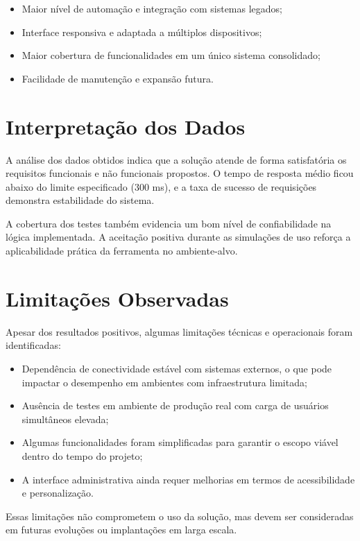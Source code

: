 \begin{itemize}
  \item Maior nível de automação e integração com sistemas legados;
  \item Interface responsiva e adaptada a múltiplos dispositivos;
  \item Maior cobertura de funcionalidades em um único sistema consolidado;
  \item Facilidade de manutenção e expansão futura.
\end{itemize}

\section{Interpretação dos Dados}

A análise dos dados obtidos indica que a solução atende de forma satisfatória os requisitos funcionais e não funcionais propostos. O tempo de resposta médio ficou abaixo do limite especificado (300 ms), e a taxa de sucesso de requisições demonstra estabilidade do sistema.

A cobertura dos testes também evidencia um bom nível de confiabilidade na lógica implementada. A aceitação positiva durante as simulações de uso reforça a aplicabilidade prática da ferramenta no ambiente-alvo.

\section{Limitações Observadas}

Apesar dos resultados positivos, algumas limitações técnicas e operacionais foram identificadas:

\begin{itemize}
  \item Dependência de conectividade estável com sistemas externos, o que pode impactar o desempenho em ambientes com infraestrutura limitada;
  \item Ausência de testes em ambiente de produção real com carga de usuários simultâneos elevada;
  \item Algumas funcionalidades foram simplificadas para garantir o escopo viável dentro do tempo do projeto;
  \item A interface administrativa ainda requer melhorias em termos de acessibilidade e personalização.
\end{itemize}

Essas limitações não comprometem o uso da solução, mas devem ser consideradas em futuras evoluções ou implantações em larga escala.

